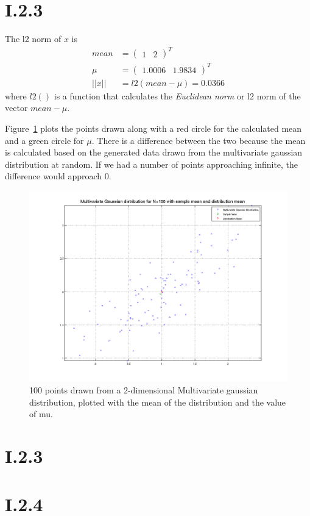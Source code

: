 \section*{I.2.3}
The l2 norm of $x$ is 
\begin{align*}
	mean  &= \begin{pmatrix}1 & 2\end{pmatrix}^T \\
	\mu   &= \begin{pmatrix}1.0006 & 1.9834\end{pmatrix}^T \\
	||x|| &= l2(mean - \mu) = 0.0366
\end{align*}
where $l2()$ is a function that calculates the \textit{Euclidean norm} or l2 norm of the vector $mean - \mu$.

Figure~\ref{fig:I.2.3} plots the points drawn along with a red circle for the calculated mean and a green circle
for $\mu$. There is a difference between the two because the mean is calculated based on the generated data drawn
from the multivariate gaussian distribution at random. If we had a number of points approaching infinite, the difference
would approach 0.

\begin{figure}[h!]
	\includegraphics[width=\textwidth]{img/multigaussmeanxy}
	\caption{100 points drawn from a 2-dimensional Multivariate gaussian distribution, plotted with
	the mean of the distribution and the value of mu. \label{fig:I.2.3}}
\end{figure}

\section*{I.2.3}

\section*{I.2.4}

